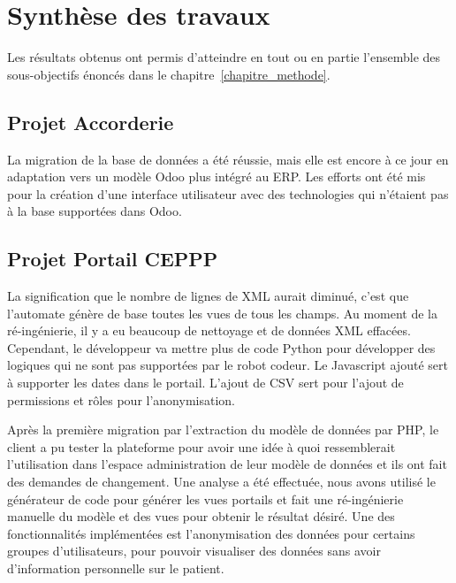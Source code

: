 \label{sec:Conclusion}

\section{Synthèse des travaux}
Les résultats obtenus ont permis d’atteindre en tout ou en partie l’ensemble des sous-objectifs énoncés dans le chapitre~\ref{chapitre_methode}.%

\subsection{Projet Accorderie}
La migration de la base de données a été réussie, mais elle est encore à ce jour en adaptation vers un modèle Odoo plus intégré au ERP. Les efforts ont été mis pour la création d’une interface utilisateur avec des technologies qui n’étaient pas à la base supportées dans Odoo.

\subsection{Projet Portail CEPPP}
La signification que le nombre de lignes de XML aurait diminué, c’est que l’automate génère de base toutes les vues de tous les champs. Au moment de la ré-ingénierie, il y a eu beaucoup de nettoyage et de données XML effacées. Cependant, le développeur va mettre plus de code Python pour développer des logiques qui ne sont pas supportées par le robot codeur. Le Javascript ajouté sert à supporter les dates dans le portail. L’ajout de CSV sert pour l’ajout de permissions et rôles pour l’anonymisation.

Après la première migration par l’extraction du modèle de données par PHP, le client a pu tester la plateforme pour avoir une idée à quoi ressemblerait l’utilisation dans l’espace administration de leur modèle de données et ils ont fait des demandes de changement. Une analyse a été effectuée, nous avons utilisé le générateur de code pour générer les vues portails et fait une ré-ingénierie manuelle du modèle et des vues pour obtenir le résultat désiré. Une des fonctionnalités implémentées est l’anonymisation des données pour certains groupes d’utilisateurs, pour pouvoir visualiser des données sans avoir d’information personnelle sur le patient.




